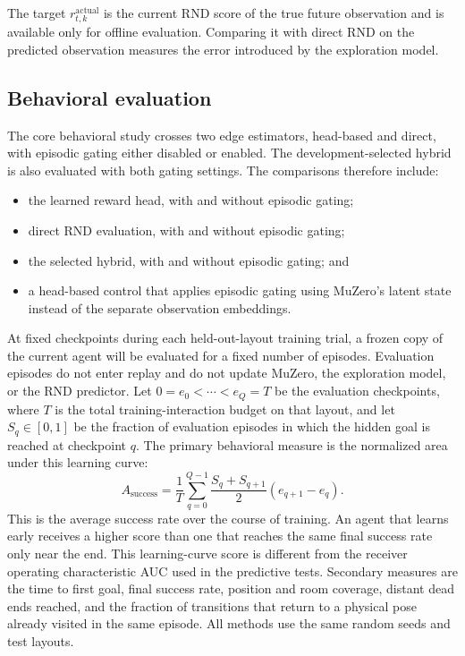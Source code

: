 \documentclass{article}
\begin{document}
The target $r^{\mathrm{actual}}_{t,k}$ is the current RND score of the true
future observation and is available only for offline evaluation. Comparing it
with direct RND on the predicted observation measures the error introduced by
the exploration model.

\subsection{Behavioral evaluation}

The core behavioral study crosses two edge estimators, head-based and direct,
with episodic gating either disabled or enabled. The development-selected
hybrid is also evaluated with both gating settings. The comparisons therefore
include:
\begin{itemize}
    \item the learned reward head, with and without episodic gating;
    \item direct RND evaluation, with and without episodic gating;
    \item the selected hybrid, with and without episodic gating; and
    \item a head-based control that applies episodic gating using MuZero's
    latent state instead of the separate observation embeddings.
\end{itemize}

At fixed checkpoints during each held-out-layout training trial, a frozen copy
of the current agent will be evaluated for a fixed number of episodes.
Evaluation episodes do not enter replay and do not update MuZero, the
exploration model, or the RND predictor. Let
$0=e_0<\cdots<e_Q=T$ be the evaluation checkpoints, where $T$ is the total
training-interaction budget on that layout, and let $S_q\in[0,1]$ be the
fraction of evaluation episodes in which the hidden goal is reached at
checkpoint $q$. The primary
behavioral measure is the normalized area under this learning curve:
\begin{equation}
    A_{\mathrm{success}}
      =\frac{1}{T}\sum_{q=0}^{Q-1}
       \frac{S_q+S_{q+1}}{2}
       \left(e_{q+1}-e_q\right).
\end{equation}
This is the average success rate over the course of training. An agent that
learns early receives a higher score than one that reaches the same final
success rate only near the end. This learning-curve score is different from
the receiver operating characteristic AUC used in the predictive tests.
Secondary measures are the time to first goal, final success rate, position and
room coverage, distant dead ends reached, and the fraction of transitions that
return to a physical pose already visited in the same episode. All methods use
the same random seeds and test layouts.
\end{document}
